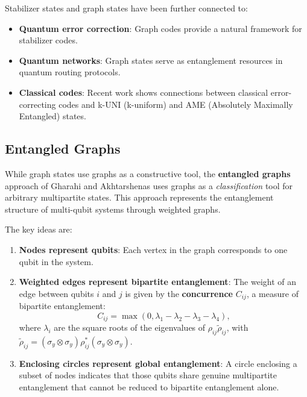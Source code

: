 \documentclass[%
 amsmath,amssymb,
 aps,
rmp,
]{revtex4-2}
\begin{document}
Stabilizer states and graph states have been further connected to:
\begin{itemize}
	\item \textbf{Quantum error correction}: Graph codes provide a natural framework for stabilizer codes.
	\item \textbf{Quantum networks}: Graph states serve as entanglement resources in quantum routing protocols.
	\item \textbf{Classical codes}: Recent work shows connections between classical error-correcting codes and k-UNI (k-uniform) and AME (Absolutely Maximally Entangled) states.
\end{itemize}






\subsection{Entangled Graphs}
\label{sec:entangled-graphs}

While graph states use graphs as a constructive tool, the \textbf{entangled graphs} approach of Gharahi and Akhtarshenas \cite{EntangledGraphs} uses graphs as a \emph{classification} tool for arbitrary multipartite states. This approach represents the entanglement structure of multi-qubit systems through weighted graphs.

The key ideas are:
\begin{enumerate}
	\item \textbf{Nodes represent qubits}: Each vertex in the graph corresponds to one qubit in the system.
	\item \textbf{Weighted edges represent bipartite entanglement}: The weight of an edge between qubits $i$ and $j$ is given by the \textbf{concurrence} $C_{ij}$, a measure of bipartite entanglement:
	      \begin{equation}
		      C_{ij} = \max(0, \lambda_1 - \lambda_2 - \lambda_3 - \lambda_4),
	      \end{equation}
	      where $\lambda_i$ are the square roots of the eigenvalues of $\rho_{ij}\tilde{\rho}_{ij}$, with $\tilde{\rho}_{ij} = (\sigma_y \otimes \sigma_y) \rho_{ij}^* (\sigma_y \otimes \sigma_y)$.
	\item \textbf{Enclosing circles represent global entanglement}: A circle enclosing a subset of nodes indicates that those qubits share genuine multipartite entanglement that cannot be reduced to bipartite entanglement alone.
\end{enumerate}
\end{document}
